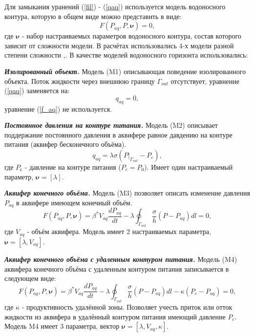 \documentclass{article}
\begin{document}
Для замыкания уранений (\ref{fil}) - (\ref{qaq}) используется модель водоносного контура, которую в общем виде можно представить в виде: 
\begin{equation} \label{f_aq}
F(P_{aq}, P,\boldsymbol{\nu})=0,
\end{equation}
где $\boldsymbol{\nu}$ - набор настраиваемых параметров водоносного контура, состав которого зависит от сложности модели. В расчётах использовались 4-х модели разной степени сложности \cite{dake},\cite{fet}. В качестве моделей водоносного горизонта использовались:

\textbf{\textit{Изолированный объект.}}
Модель (M1) описывающая поведение изолированного объекта. Поток жидкости через внешнюю границу $\Gamma_{out}$ отсутствует, уравнение (\ref{qaq}) заменяется на:
\begin{equation}
q_{aq}=0,
\end{equation}
уравнение (\ref{f_aq}) не используется.

\textbf{\textit{Постоянное давления на контуре питания.}}
Модель (M2) описывает поддержание постоянного давления в аквифере равное давдению на контуре питания (аквифер бесконечного объёма). 
\begin{equation}
q_{aq} = \lambda\sigma(P|_{\Gamma_{out}}-P_c),
\end{equation}
где $P_с$ - давление на контуре питания ($P_c = P_0$). Имеет один настраиваемый параметр, $\boldsymbol{\nu} = [\lambda]$.

\textbf{\textit{Аквифер конечного объёма.}}
Модель (M3) позволяет описать изменение давления $P_{aq}$ в аквифере имеющем конечный объём. 
\begin{equation}
F(P_{aq}, P,\boldsymbol{\nu})=\beta^*V_{aq}\frac{dP_{aq}}{dt} - \lambda\oint_{\Gamma_{out}}\frac{\sigma}{h}(P-P_{aq})dl = 0,
\end{equation}
где $V_{aq}$ - объём аквифера. Модель имеет 2 настраиваемых параметра, $\boldsymbol{\nu} = [\lambda, V_{aq}]$.

\textbf{\textit{Аквифер конечного объёма с удаленным контуром питания.}}
Модель (M4) аквифера конечного объёма с удаленным контуром питания записывается в следующем виде: 
\begin{equation}
F(P_{aq}, P,\boldsymbol{\nu})=\beta^*V_{aq}\frac{dP_{aq}}{dt} -\lambda\oint_{\Gamma_{out}}\frac{\sigma}{h}(P-P_{aq})dl - \kappa(P_c - P_{aq})=0,
\end{equation}
где $\kappa$ - продуктивность удалённой зоны. Позволяет учесть приток или отток жидкости из аквифера в удалённый контуром питания имеющий давление $P_{c}$. Модель M4 имеет 3 параметра, вектор $\boldsymbol{\nu} = [\lambda, V_{aq}, \kappa]$.
\end{document}

